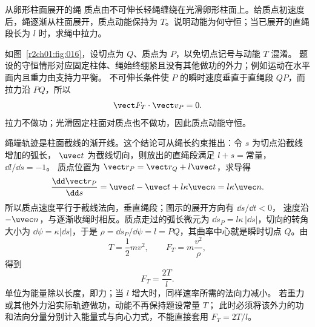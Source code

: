 \begin{practicebox}{从卵形柱面展开的绳}
质点由不可伸长轻绳缠绕在光滑卵形柱面上。给质点初速度后，绳逐渐从柱面展开，质点动能保持为 $T$。说明动能为何守恒；当已展开的直绳段长为 $l$ 时，求绳中拉力。
\label{r2ch01:pr:013}
\begin{solution}
如图~\ref{r2ch01:fig:016}，设切点为 $Q$、质点为 $P$，以免切点记号与动能 $T$ 混淆。
题设的守恒情形对应固定柱体、绳始终绷紧且没有其他做功的外力；例如运动在水平面内且重力由支持力平衡。
不可伸长条件使 $P$ 的瞬时速度垂直于直绳段 $QP$，而拉力沿 $PQ$，所以
\[
  \vect F_T\cdot\vect v_P=0.
\]
拉力不做功；光滑固定柱面对质点也不做功，因此质点动能守恒。

\figInvolute

绳端轨迹是柱面截线的渐开线。这个结论可从绳长约束推出：令 $s$ 为切点沿截线增加的弧长，
$\uvec t$ 为截线切向，则放出的直绳段满足 $l+s=\text{常量}$，$\dd l/\dd s=-1$。
质点位置为 $\vect r_P=\vect r_Q+l\uvec t$，求导得
\[
 \frac{\dd\vect r_P}{\dd s}
 =\uvec t-\uvec t+l\kappa\uvec n=l\kappa\uvec n.
\]
所以质点速度平行于截线法向，垂直绳段；图示的展开方向有 $\dd s/\dd t<0$，
速度沿 $-\uvec n$，与逐渐收绳时相反。质点走过的弧长微元为
$\dd s_P=l\kappa\,|\dd s|$，切向的转角大小为 $\dd\psi=\kappa|\dd s|$，于是
$\rho=\dd s_P/\dd\psi=l=PQ$，其曲率中心就是瞬时切点 $Q$。由
\[
  T=\frac12mv^2,\qquad F_T=m\frac{v^2}{\rho},
\]
得到
\[
  \boxed{F_T=\frac{2T}{l}}.
\]
单位为能量除以长度，即力；当 $l$ 增大时，同样速率所需的法向力减小。
若重力或其他外力沿实际轨迹做功，动能不再保持题设常量 $T$；
此时必须将该外力的功和法向分量分别计入能量式与向心力式，不能直接套用 $F_T=2T/l$。
\end{solution}
\end{practicebox}


